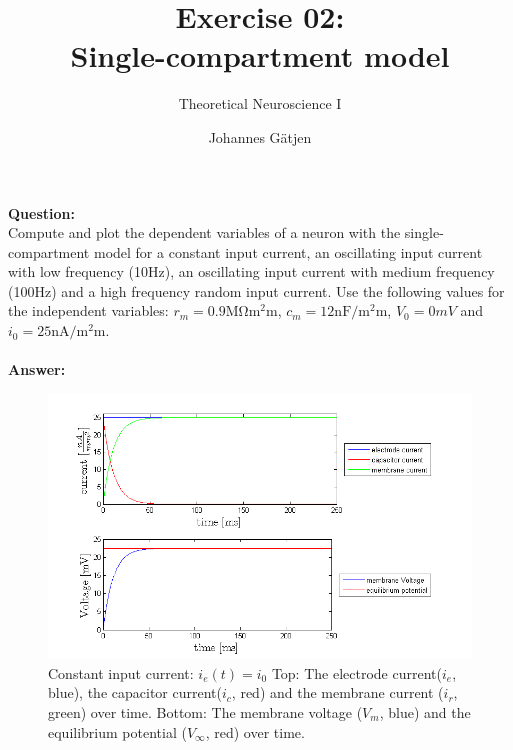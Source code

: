 \documentclass{scrartcl}
\title{Exercise 02:\\Single-compartment model}
\subtitle{Theoretical Neuroscience I}
\author{Johannes G\"atjen}
\newcommand\Question{%
  \textbf{Question:}%
}
\newcommand\Answer{%
  \textbf{Answer:}%
}
\begin{document}
\maketitle
\Question\\
Compute and plot the dependent variables of a neuron with the single-compartment model for a constant input current, an oscillating input current with low frequency (10\si{Hz}), an oscillating input current with medium frequency (100\si{Hz}) and a high frequency random input current. Use the following values for the independent variables: $r_m = 0.9\si{\mega\ohm\square\milli\meter}$, $c_m = 12\si{\nano\farad\per\square\milli\meter}$, $V_0 = 0\si{mV}$ and $i_0 = 25 \si{\nano\ampere\per\square\milli\meter}$.
\\\\
\Answer\\
\begin{figure}[h]
\centering
\includegraphics[trim = {1.3cm 0 2cm 0.9cm}, width=\textwidth, clip]{../pics/constant}
\caption{\small{Constant input current: $i_e(t) = i_0$ Top: The electrode current($i_e$, blue), the capacitor current($i_c$, red) and the membrane current ($i_r$, green) over time. Bottom: The membrane voltage ($V_m$, blue) and the equilibrium potential ($V_\infty$, red) over time.}}
\label{constant}
\end{figure}
\end{document}
